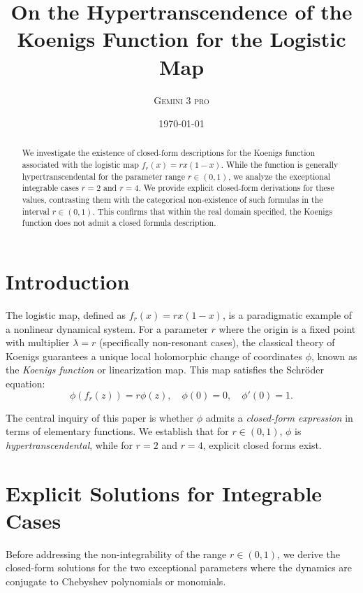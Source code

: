 \documentclass[11pt, a4paper]{article}
\title{\textbf{On the Hypertranscendence of the Koenigs Function for the Logistic Map}}
\author{\textsc{Gemini 3 pro}}
\date{\today}
\theoremstyle{definition}
\begin{document}
\maketitle

\begin{abstract}
\noindent We investigate the existence of closed-form descriptions for the Koenigs function associated with the logistic map $f_r(x) = rx(1-x)$. While the function is generally hypertranscendental for the parameter range $r \in (0,1)$, we analyze the exceptional integrable cases $r=2$ and $r=4$. We provide explicit closed-form derivations for these values, contrasting them with the categorical non-existence of such formulas in the interval $r \in (0,1)$. This confirms that within the real domain specified, the Koenigs function does not admit a closed formula description.
\end{abstract}

\section{Introduction}

The logistic map, defined as $f_r(x) = rx(1-x)$, is a paradigmatic example of a nonlinear dynamical system. For a parameter $r$ where the origin is a fixed point with multiplier $\lambda = r$ (specifically non-resonant cases), the classical theory of Koenigs \cite{Koenigs1884} guarantees a unique local holomorphic change of coordinates $\phi$, known as the \textit{Koenigs function} or linearization map. This map satisfies the Schröder equation:
\begin{equation} \label{eq:schroder}
\phi(f_r(z)) = r \phi(z), \quad \phi(0)=0, \quad \phi'(0)=1.
\end{equation}

The central inquiry of this paper is whether $\phi$ admits a \textit{closed-form expression} in terms of elementary functions. We establish that for $r \in (0,1)$, $\phi$ is \textit{hypertranscendental}, while for $r=2$ and $r=4$, explicit closed forms exist.

\section{Explicit Solutions for Integrable Cases}

Before addressing the non-integrability of the range $r \in (0,1)$, we derive the closed-form solutions for the two exceptional parameters where the dynamics are conjugate to Chebyshev polynomials or monomials.
\end{document}
